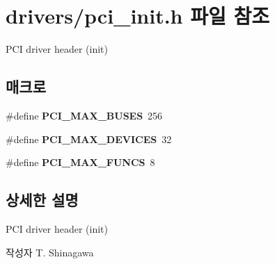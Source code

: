 \section{drivers/pci\-\_\-init.h 파일 참조}
\label{pci__init_8h}


P\-C\-I driver header (init)  


\subsection*{매크로}
\begin{DoxyCompactItemize}
\item 
\#define {\bfseries P\-C\-I\-\_\-\-M\-A\-X\-\_\-\-B\-U\-S\-E\-S}~256\label{pci__init_8h_a5f2c53dbe30f05e12e6ad5c04e8f2dd1}

\item 
\#define {\bfseries P\-C\-I\-\_\-\-M\-A\-X\-\_\-\-D\-E\-V\-I\-C\-E\-S}~32\label{pci__init_8h_ac92b961e4ae0fbfdb814592b74fa3229}

\item 
\#define {\bfseries P\-C\-I\-\_\-\-M\-A\-X\-\_\-\-F\-U\-N\-C\-S}~8\label{pci__init_8h_a3d41896412fa051ee9ab75394a590c74}

\end{DoxyCompactItemize}


\subsection{상세한 설명}
P\-C\-I driver header (init) \begin{DoxyAuthor}{작성자}
T. Shinagawa 
\end{DoxyAuthor}
